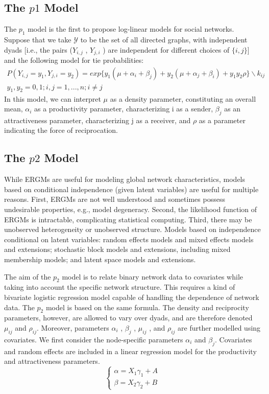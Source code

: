 \documentclass[12pt]{ociamthesis}  %
\begin{document}
	\subsection{The $p1$ Model}
	
	The $p_{1}$ model is the first to propose log-linear models for social networks. Suppose that we take $\mathcal{Y}$ to be the set of all directed graphs, with independent dyads [i.e., the pairs ($Y_{i,j}$ , $Y_{j,i}$ ) are independent for different choices of $\{i, j\}$] and the following model for tie probabilities:
	\begin{multline}
	P(Y_{i,j} = y_{1}, Y_{j,i} = y_{2}) = exp \{ y_{1}(\mu + \alpha_{i} + \beta_{j}) + y_{2}(\mu + \alpha_{j} + \beta_{i}) + y_{1}y_{2} \rho\} \backslash k_{ij} \\  y_{1}, y_{2} = 0,1 ; i,j = 1,...,n; i \neq j 
	\end{multline}
	In this model, we can interpret $\mu$ as a density parameter, constituting an overall mean, $\alpha_{i}$ as a productivity parameter, characterizing i as a sender, $\beta_{j}$ as an attractiveness parameter, characterizing j as a receiver, and $\rho$ as a parameter indicating the force of reciprocation.
	
	\subsection{The $p2$ Model}
	
	While ERGMs are useful for modeling global network characteristics, models based on conditional independence (given latent variables) are useful for multiple reasons. First, ERGMs are not well understood and sometimes possess undesirable properties, e.g., model degeneracy. Second, the likelihood function of ERGMs is intractable, complicating statistical computing. Third, there may be unobserved heterogeneity or unobserved structure.
	Models based on independence conditional on latent variables: random effects models and mixed effects models and extensions; stochastic block models and extensions, including mixed membership models; and latent space models and extensions.
	
	The aim of the $p_{2}$ model is to relate binary network data to covariates while taking into account the specific network structure. This requires a kind of bivariate logistic regression model capable of handling the dependence of network data. The $p_{2}$ model is based on the same formula. The density and reciprocity parameters, however, are allowed to vary over dyads, and are therefore denoted $\mu_{ij} $ and $\rho_{ij}$. Moreover, parameters $\alpha_{i}$ , $\beta_{j}$ , $\mu_{ij}$ , and $\rho_{ij}$ are further modelled using covariates. We first consider the node-specific parameters $\alpha_{i}$ and $\beta_{j}$. Covariates and random effects are included in a linear regression model for the productivity and attractiveness parameters.
	\begin{equation}
	\begin{cases}
	\alpha = X_{1} \gamma_{1} + A \\
	\beta = X_{2} \gamma_{2} + B
	\end{cases}
	\end{equation}
\end{document}
